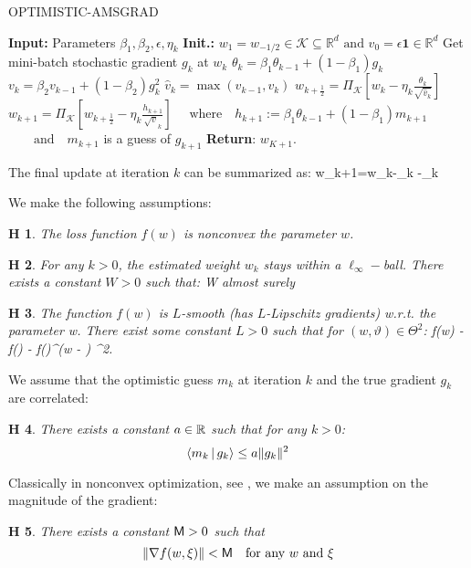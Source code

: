 \documentclass[11pt]{article}
\newtheorem{assumption}{H\!\!}
\theoremstyle{k}
\begin{document}
\begin{algorithm}[H]
\caption{OPTIMISTIC-AMSGRAD}\label{alg:opt-ams}
  \begin{algorithmic}[1]
  \STATE \textbf{Input:} Parameters $\beta_{1}, \beta_{2}, \epsilon, \eta_{k}$
  \STATE \textbf{Init.:} $w_{1}=w_{-1 / 2} \in \mathcal{K} \subseteq \mathbb{R}^{d} \text { and } v_{0}=\epsilon \mathbf{1} \in \mathbb{R}^{d}$
  \STATE Get mini-batch stochastic gradient $g_{k}$ at $w_{k}$
   \STATE $\theta_{k}=\beta_{1} \theta_{k-1}+\left(1-\beta_{1}\right) g_{k}$
   \STATE $v_{k}=\beta_{2} v_{k-1}+\left(1-\beta_{2}\right) g_{k}^{2}$
   \STATE $ \hat{v}_{k}=\max \left(\hat{v}_{k-1}, v_{k}\right)$
   \STATE $ w_{k+\frac{1}{2}}=\Pi_{\mathcal{K}}\left[w_k-\eta_{k} \frac{\theta_{k}}{\sqrt{\hat{v}_{k}}}\right]$
   \STATE $ w_{k+1}=\Pi_{\mathcal{K}}\left[w_{k+\frac{1}{2}}-\eta_{k} \frac{h_{k+1}}{\sqrt{v}_{k}}\right]$
   \STATE $ \quad \text{where} \quad h_{k+1}:=\beta_{1} \theta_{k-1} + (1-\beta_{1}) m_{k+1}$
      \STATE $ \quad\quad \text{and} \quad m_{k+1}$ is a guess of $g_{k+1}$
\ENDFOR
\STATE \textbf{Return}: $w_{K+1}$.
  \end{algorithmic}
\end{algorithm}\vspace{.1cm}
The final update at iteration $k$ can be summarized as:
\beq\label{eq:finalupdate}
w_{k+1}=w_{k}-\eta_{k} -\eta_{k} 
\eeq



We make the following assumptions:
\begin{assumption}\label{ass:nonconv}
The loss function $f(w)$ is nonconvex \wrt the parameter $w$.
\end{assumption}

\begin{assumption}\label{ass:boundedparam}
For any $k >0$, the estimated weight $w_k$ stays within a $\ell_{\infty}-$ball. There exists a constant $W >0$ such that:
\beq
{} \leq W \quad \textrm{almost surely}
\eeq
\end{assumption}

\begin{assumption}\label{ass:smooth}
The function $f(w)$ is $L$-smooth (has $L$-Lipschitz gradients) w.r.t. the parameter w.
There exist some constant $L > 0$ such that for $(w, \vartheta) \in \Theta^2$:
\beq
f(w) - f(\vartheta) - \nabla f(\vartheta)^\top(w - \vartheta) \leq {} ^2\eqsp.
\eeq
\end{assumption}
We assume that the optimistic guess $m_k$ at iteration $k$ and the true gradient $g_k$ are correlated:
\begin{assumption}\label{ass:guessbound}
There exists a constant $a \in \mathbb{R} $ such that for any $k >0$:
$$
 \left\langle m_k\,|\, g_k \right\rangle  \leq a \|g_k\|^2
$$
\end{assumption}
Classically in nonconvex optimization, see \citep{ghadimi2013stochastic}, we make an assumption on the magnitude of the gradient:
\begin{assumption}\label{ass:bounded}
There exists a constant $\mathsf{M} >0$ such that 
$$
\left\Vert \nabla f(w, \xi) \right\Vert < \mathsf{M} \quad \textrm{for any $w$ and $\xi$}
$$
\end{assumption}
\end{document}
